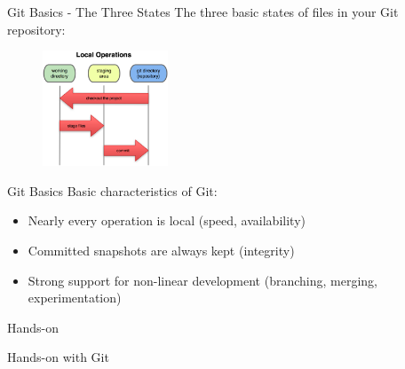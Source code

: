 \documentclass{beamer}
\def \figureHeight {130px}
\begin{document}
\begin{frame}{Git Basics - The Three States}
The three basic states of files in your Git repository:
\begin{figure}
   \includegraphics[height=\figureHeight]{images/the-three-states.png}
\end{figure}
\end{frame}

\begin{frame}{Git Basics}
Basic characteristics of Git:
\begin{itemize}
  \item Nearly every operation is local (speed, availability)
  \item Committed snapshots are always kept (integrity)
  \item Strong support for non-linear development (branching, merging, experimentation)
\end{itemize}
\end{frame}

\begin{frame}{Hands-on}
	\begin{center}
		Hands-on with Git
	\end{center}
\end{frame}
\end{document}
